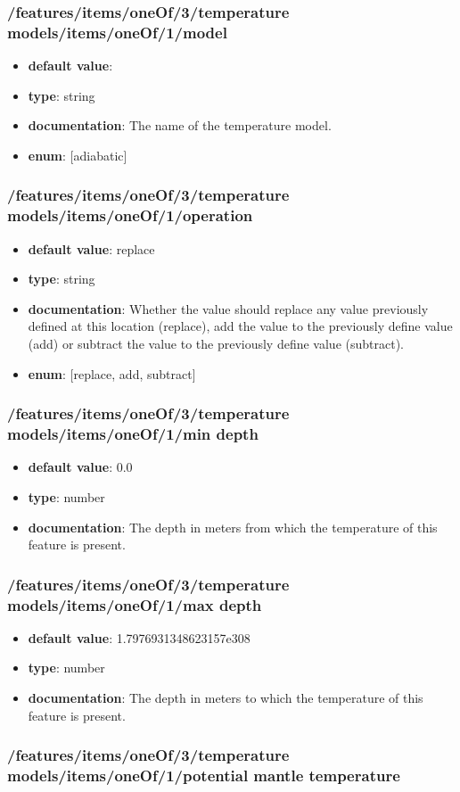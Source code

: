 \subsubsection{/features/items/oneOf/3/temperature models/items/oneOf/1/model}
\begin{itemize}\item {\bf default value}: 
\item {\bf type}: string
\item {\bf documentation}: The name of the temperature model.
\item {\bf enum}: [adiabatic]\end{itemize}\subsubsection{/features/items/oneOf/3/temperature models/items/oneOf/1/operation}
\begin{itemize}\item {\bf default value}: replace
\item {\bf type}: string
\item {\bf documentation}: Whether the value should replace any value previously defined at this location (replace), add the value to the previously define value (add) or subtract the value to the previously define value (subtract).
\item {\bf enum}: [replace, add, subtract]\end{itemize}\subsubsection{/features/items/oneOf/3/temperature models/items/oneOf/1/min depth}
\begin{itemize}\item {\bf default value}: 0.0
\item {\bf type}: number
\item {\bf documentation}: The depth in meters from which the temperature of this feature is present.
\end{itemize}\subsubsection{/features/items/oneOf/3/temperature models/items/oneOf/1/max depth}
\begin{itemize}\item {\bf default value}: 1.7976931348623157e308
\item {\bf type}: number
\item {\bf documentation}: The depth in meters to which the temperature of this feature is present.
\end{itemize}\subsubsection{/features/items/oneOf/3/temperature models/items/oneOf/1/potential mantle temperature}
